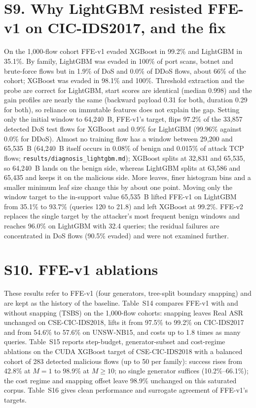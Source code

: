 \section*{S9. Why LightGBM resisted FFE-v1 on CIC-IDS2017, and the fix}

On the 1,000-flow cohort FFE-v1 evaded XGBoost in 99.2\% and LightGBM in 35.1\%. By family, LightGBM was evaded in 100\% of port scans, botnet and brute-force flows but in 1.9\% of DoS and 0.0\% of DDoS flows, about 66\% of the cohort; XGBoost was evaded in 98.1\% and 100\%. Threshold extraction and the probe are correct for LightGBM, start scores are identical (median 0.998) and the gain profiles are nearly the same (backward payload 0.31 for both, duration 0.29 for both), so reliance on immutable features does not explain the gap. Setting only the initial window to 64,240~B, FFE-v1's target, flips 97.2\% of the 33,857 detected DoS test flows for XGBoost and 0.9\% for LightGBM (99.96\% against 0.0\% for DDoS). Almost no training flow has a window between 29,200 and 65,535~B (64,240~B itself occurs in 0.08\% of benign and 0.015\% of attack TCP flows; \texttt{results/diagnosis\_lightgbm.md}); XGBoost splits at 32,831 and 65,535, so 64,240~B lands on the benign side, whereas LightGBM splits at 63,586 and 65,435 and keeps it on the malicious side. More leaves, finer histogram bins and a smaller minimum leaf size change this by about one point. Moving only the window target to the in-support value 65,535~B lifted FFE-v1 on LightGBM from 35.1\% to 93.7\% (queries 120 to 21.8) and left XGBoost at 99.2\%. FFE-v2 replaces the single target by the attacker's most frequent benign windows and reaches 96.0\% on LightGBM with 32.4 queries; the residual failures are concentrated in DoS flows (90.5\% evaded) and were not examined further.

\section*{S10. FFE-v1 ablations}

These results refer to FFE-v1 (four generators, tree-split boundary snapping) and are kept as the history of the baseline. Table~S14 compares FFE-v1 with and without snapping (TSBS) on the 1,000-flow cohorts: snapping leaves Real ASR unchanged on CSE-CIC-IDS2018, lifts it from 97.5\% to 99.2\% on CIC-IDS2017 and from 54.6\% to 57.6\% on UNSW-NB15, and costs up to 1.8 times as many queries. Table~S15 reports step-budget, generator-subset and cost-regime ablations on the CUDA XGBoost target of CSE-CIC-IDS2018 with a balanced cohort of 283 detected malicious flows (up to 50 per family): success rises from 42.8\% at $M=1$ to 98.9\% at $M\ge10$; no single generator suffices (10.2\%--66.1\%); the cost regime and snapping offset leave 98.9\% unchanged on this saturated corpus. Table~S16 gives clean performance and surrogate agreement of FFE-v1's targets.

